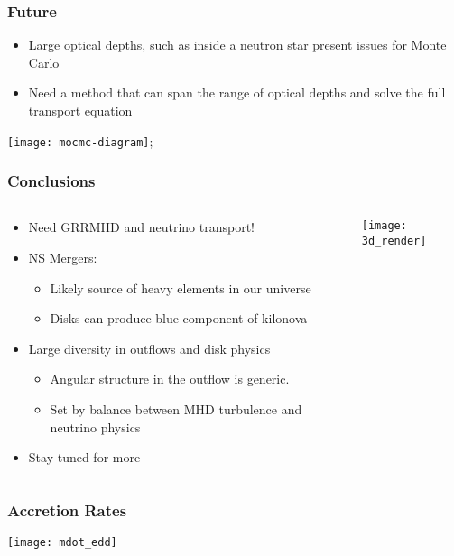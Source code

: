 \documentclass[]{beamer}
\newcommand{\backupbegin}{
   \newcounter{finalframe}
   \setcounter{finalframe}{\value{framenumber}}
}
\begin{document}
\begin{frame}
  \frametitle{Future}
  \begin{itemize}
  \item Large optical depths, such as inside a neutron star present issues for Monte Carlo
  \item Need a method that can span the range of optical depths and solve the full transport equation
  \end{itemize}
  \begin{center}
    \texttt{[image: mocmc-diagram]};
  \end{center}
\end{frame}

\begin{frame}
  \frametitle{Conclusions}
  \begin{columns}
    \begin{column}{7cm}
      \begin{itemize}
      \item Need GRRMHD and neutrino transport!
      \item NS Mergers:
        \begin{itemize}
        \item Likely source of heavy elements in our
          universe
        \item Disks can produce blue component of kilonova
        \end{itemize}
      \item Large diversity in outflows and disk physics
        \begin{itemize}
        \item Angular structure in the outflow is generic.
        \item Set by balance between MHD turbulence and neutrino physics
        \end{itemize}
      \item Stay tuned for more
      \end{itemize}
    \end{column}
    \begin{column}{5cm}
      \texttt{[image: 3d\_render]}
    \end{column}
  \end{columns}
\end{frame}

\backupbegin

\begin{frame}
  \frametitle{Accretion Rates}
  \begin{center}
    \texttt{[image: mdot\_edd]}
  \end{center}
\end{frame}
\end{document}
